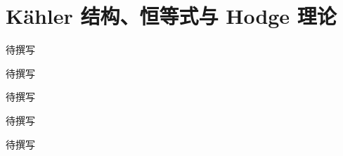 
% 
% 

\chapter{Kähler 结构、恒等式与 Hodge 理论}
\label{g4:ch:17}

\begin{chapterabstract}
待撰写
\end{chapterabstract}

\begin{learninggoals}
待撰写
\end{learninggoals}

待撰写









\begin{chaptersummary}
待撰写
\end{chaptersummary}

\BookExercises
待撰写
